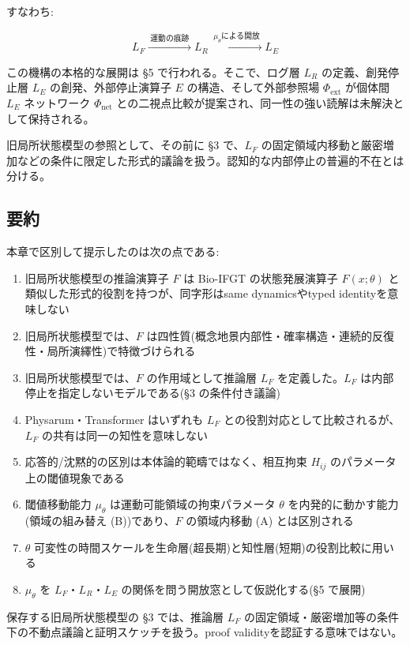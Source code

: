 すなわち:

\[
L_F \xrightarrow{\;\text{運動の痕跡}\;} L_R \xrightarrow{\;\mu_\theta \text{による開放}\;} L_E
\]

この機構の本格的な展開は \S{}5 で行われる。そこで、ログ層 $L_R$ の定義、創発停止層 $L_E$ の創発、外部停止演算子 $E$ の構造、そして外部参照場 $\Phi_{\text{ext}}$ が個体間 $L_E$ ネットワーク $\Phi_{\text{net}}$ との二視点比較が提案され、同一性の強い読解は未解決として保持される。

旧局所状態模型の参照として、その前に \S{}3 で、$L_F$ の固定領域内移動と厳密増加などの条件に限定した形式的議論を扱う。認知的な内部停止の普遍的不在とは分ける。

\bigskip


\subsection{要約}


本章で区別して提示したのは次の点である:

\begin{enumerate}
\item 旧局所状態模型の推論演算子 $F$ は Bio-IFGT の状態発展演算子 $F(x;\theta)$ と類似した形式的役割を持つが、同字形はsame dynamicsやtyped identityを意味しない
\item 旧局所状態模型では、$F$ は四性質(概念地景内部性・確率構造・連続的反復性・局所演繹性)で特徴づけられる
\item 旧局所状態模型では、$F$ の作用域として推論層 $L_F$ を定義した。$L_F$ は内部停止を指定しないモデルである(\S{}3 の条件付き議論)
\item Physarum・Transformer はいずれも $L_F$ との役割対応として比較されるが、$L_F$ の共有は同一の知性を意味しない
\item 応答的/沈黙的の区別は本体論的範疇ではなく、相互拘束 $H_{ij}$ のパラメータ上の閾値現象である
\item 閾値移動能力 $\mu_\theta$ は運動可能領域の拘束パラメータ $\theta$ を内発的に動かす能力(領域の組み替え (B))であり、$F$ の領域内移動 (A) とは区別される
\item $\theta$ 可変性の時間スケールを生命層(超長期)と知性層(短期)の役割比較に用いる
\item $\mu_\theta$ を $L_F$・$L_R$・$L_E$ の関係を問う開放窓として仮説化する(\S{}5 で展開)
\end{enumerate}


保存する旧局所状態模型の \S{}3 では、推論層 $L_F$ の固定領域・厳密増加等の条件下の不動点議論と証明スケッチを扱う。proof validityを認証する意味ではない。

\bigskip
